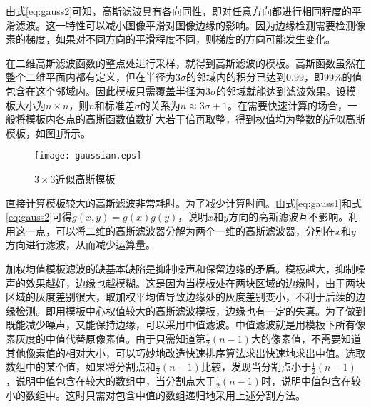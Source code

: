 由式\eqref{eq:gauss2}可知，高斯滤波具有各向同性，即对任意方向都进行相同程度的平滑滤波。这一特性可以减小图像平滑对图像边缘的影响。因为边缘检测需要检测像素的梯度，如果对不同方向的平滑程度不同，则梯度的方向可能发生变化。

在二维高斯滤波函数的整点处进行采样，就得到高斯滤波的模板。高斯函数虽然在整个二维平面内都有定义，但在半径为$3\sigma$的邻域内的积分已达到0.99，即99\%的值包含在这个邻域内。因此模板只需覆盖半径为$3\sigma$的邻域就能达到滤波效果。设模板大小为$n\times n$，则$n$和标准差$\sigma$的关系为$n\approx 3\sigma+1$。在需要快速计算的场合，一般将模板内各点的高斯函数值数扩大若干倍再取整，得到权值均为整数的近似高斯模板，如图\ref{fig:gaussian}所示。
\begin{figure}[!h]
  \centering
  \texttt{[image: gaussian.eps]}
  \caption{$3\times 3$近似高斯模板}
  \label{fig:gaussian}
\end{figure}

直接计算模板较大的高斯滤波非常耗时。为了减少计算时间。由式\eqref{eq:gauss1}和式\eqref{eq:gauss2}可得$g(x,y)=g(x)g(y)$，说明$x$和$y$方向的高斯滤波互不影响。利用这一点，可以将二维的高斯滤波器分解为两个一维的高斯滤波器，分别在$x$和$y$方向进行滤波，从而减少运算量。


加权均值模板滤波的缺基本缺陷是抑制噪声和保留边缘的矛盾。模板越大，抑制噪声的效果越好，边缘也越模糊。这是因为当模板处在两块区域的边缘时，由于两块区域的灰度差别很大，取加权平均值导致边缘处的灰度差别变小，不利于后续的边缘检测。即用模板中心权值较大的高斯滤波模板，边缘也有一定的失真。为了做到既能减少噪声，又能保持边缘，可以采用中值滤波。中值滤波就是用模板下所有像素灰度的中值代替原像素值。由于只需知道第$\frac{1}{2}(n-1)$大的像素值，不需要知道其他像素值的相对大小，可以巧妙地改造快速排序算法求出快速地求出中值。选取数组中的某个值，如果将分割点和$\frac{1}{2}(n-1)$比较，发现当分割点小于$\frac{1}{2}(n-1)$，说明中值包含在较大的数组中，当分割点大于$\frac{1}{2}(n-1)$时，说明中值包含在较小的数组中。这时只需对包含中值的数组递归地采用上述分割方法。

